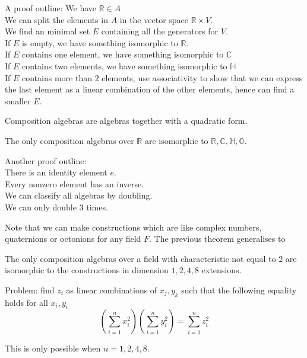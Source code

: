 \documentclass{beamer}
\begin{document}
\begin{frame}
A proof outline:
We have $\mathbb{R} \in A$
\pause
\\We can split the elements in $A$ in the vector space $\mathbb{R} \times V$.
\pause
\\We find an minimal set $E$ containing all the generators for $V$.
\pause
\\If $E$ is empty, we have something isomorphic to $\mathbb{R}$.
\pause
\\If $E$ contains one element, we have something isomorphic to $\mathbb{C}$
\pause
\\If $E$ contains two elements, we have something isomorphic to $\mathbb{H}$
\pause
\\If $E$ contains more than $2$ elements, use associativity to show that we can express the last element as a linear combination of the other elements, hence can find a smaller $E$.
\end{frame}
\begin{frame}
Composition algebras are algebras together with a quadratic form.
\pause
\begin{theorem}
The only composition algebras over $\mathbb{R}$ are isomorphic to $\mathbb{R}, \mathbb{C}, \mathbb{H}, \mathbb{O}$.
\end{theorem}
\end{frame}

\begin{frame}
Another proof outline:
\pause
\\There is an identity element $e$.
\pause
\\Every nonzero element has an inverse.
\pause
\\We can classify all algebras by doubling.
\pause
\\We can only double $3$ times.
\end{frame}

\begin{frame}
Note that we can make constructions which are like complex numbers, quaternions or octonions for any field $F$. The previous theorem generalises to
\begin{theorem}
The only composition algebras over a field with characteristic not equal to $2$ are isomorphic to the constructions in dimension $1,2,4,8$ extensions.
\end{theorem}
\end{frame}

\begin{frame}
Problem: find $z_i$ as linear combinations of $x_j, y_k$ such that the following equality holds for all $x_i, y_i$
$$(\sum_{i = 1}^n x_i^2)(\sum_{i = 1}^n y_i^2) = \sum_{i = 1}^n z_i^2$$
\pause
\begin{theorem}
This is only possible when $n = 1,2,4,8$.
\end{theorem}
\end{frame}
\end{document}
